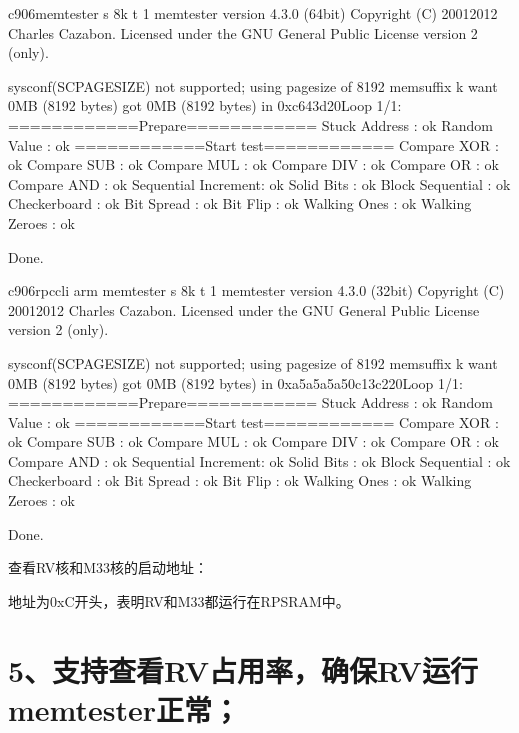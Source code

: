 \documentclass[letterpaper,10pt,english]{sphinxmanual}
\begin{document}
\begin{sphinxVerbatim}[commandchars=\\\{\}]
c906\PYGZgt{}memtester \PYGZhy{}s 8k \PYGZhy{}t 1
memtester version 4.3.0 (64\PYGZhy{}bit)
Copyright (C) 2001\PYGZhy{}2012 Charles Cazabon.
Licensed under the GNU General Public License version 2 (only).

sysconf(\PYGZus{}SC\PYGZus{}PAGE\PYGZus{}SIZE) not supported; using pagesize of 8192
memsuffix k
want 0MB (8192 bytes)
got  0MB (8192 bytes) in 0xc643d20Loop 1/1:
\PYGZlt{}============Prepare============\PYGZgt{}
  Stuck Address       : ok
  Random Value        :  ok
\PYGZlt{}============Start test============\PYGZgt{}
  Compare XOR         : ok
  Compare SUB         : ok
  Compare MUL         : ok
  Compare DIV         : ok
  Compare OR          : ok
  Compare AND         : ok
  Sequential Increment: ok
  Solid Bits          : ok
  Block Sequential    : ok
  Checkerboard        : ok
  Bit Spread          : ok
  Bit Flip            : ok
  Walking Ones        : ok
  Walking Zeroes      : ok

Done.

c906\PYGZgt{}rpccli arm memtester \PYGZhy{}s 8k \PYGZhy{}t 1 
memtester version 4.3.0 (32\PYGZhy{}bit)
Copyright (C) 2001\PYGZhy{}2012 Charles Cazabon.
Licensed under the GNU General Public License version 2 (only).

sysconf(\PYGZus{}SC\PYGZus{}PAGE\PYGZus{}SIZE) not supported; using pagesize of 8192
memsuffix k
want 0MB (8192 bytes)
got  0MB (8192 bytes) in 0xa5a5a5a50c13c220Loop 1/1:
\PYGZlt{}============Prepare============\PYGZgt{}
  Stuck Address       : ok
  Random Value        :  ok
\PYGZlt{}============Start test============\PYGZgt{}
  Compare XOR         : ok
  Compare SUB         : ok
  Compare MUL         : ok
  Compare DIV         : ok
  Compare OR          : ok
  Compare AND         : ok
  Sequential Increment: ok
  Solid Bits          : ok
  Block Sequential    : ok
  Checkerboard        : ok
  Bit Spread          : ok
  Bit Flip            : ok
  Walking Ones        : ok
  Walking Zeroes      : ok

Done.
\end{sphinxVerbatim}

\sphinxAtStartPar
查看RV核和M33核的启动地址：

\sphinxAtStartPar
{}

\sphinxAtStartPar
地址为0xC开头，表明RV和M33都运行在RPSRAM中。


\section{5、支持查看RV占用率，确保RV运行memtester正常；}
\label{\detokenize{r128_u9a8c_u8bc1_u56fa_u4ef6/r128_u9a8c_u8bc1_u56fa_u4ef6_u5f00_u53d1_u6307_u5357:id5}}
\sphinxAtStartPar
{}
\end{document}

